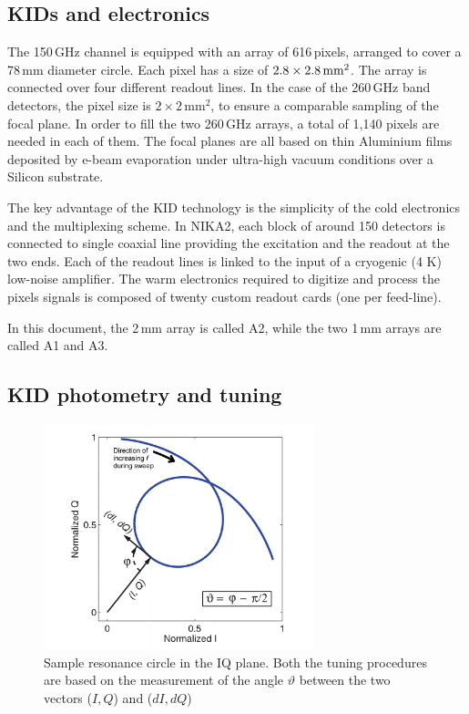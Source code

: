 \subsection{KIDs and electronics}
\label{se:array}

The 150\,GHz channel is equipped with an array of 616\,pixels, arranged to cover
a 78\,mm diameter circle. Each pixel has a size of
$2.8\times2.8\textrm{\,mm}^2$. The array is connected over four different
readout lines. In the case of the 260\,GHz band detectors, the pixel size is
$2\times 2\mathrm{\,mm}^2$, to ensure a comparable sampling of the focal
plane. In order to fill the two 260\,GHz arrays, a total of 1,140 pixels are
needed in each of them. The focal planes are all based on thin Aluminium films
deposited by e-beam evaporation under ultra-high vacuum conditions over a
Silicon substrate.

The key advantage of the KID technology is the simplicity of the cold
electronics and the multiplexing scheme. In NIKA2, each block of around 150
detectors is connected to single coaxial line providing the excitation and the
readout at the two ends. Each of the readout lines is linked to the input of a
cryogenic (4 K) low-noise amplifier. The warm electronics required to digitize
and process the pixels signals is composed of twenty custom readout cards (one
per feed-line).

In this document, the 2\,mm array is called A2, while the two 1\,mm arrays are
called A1 and A3.

\subsection{KID photometry and tuning}

\begin{figure}[!b]
\begin{center}
\includegraphics[width = 0.7\textwidth]{Figures/resoCircle-eps-converted-to.pdf}
\caption[KID resonance circle]{Sample resonance circle in the IQ plane. Both the
  tuning procedures are based on the measurement of the angle $\vartheta$
  between the two vectors ($I, Q$) and ($dI, dQ$)}
\label{figResoCircle}
\end{center}
\end{figure}

